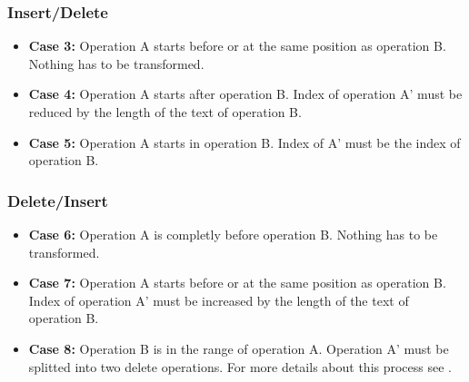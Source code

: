 \subsubsection{Insert/Delete}
\begin{itemize}
\item \textbf{Case 3:}
Operation A starts before or at the same position as operation B. Nothing has to be transformed.
\item \textbf{Case 4:}
Operation A starts after operation B. Index of operation A' must be reduced by the length of the text of operation B.
\item \textbf{Case 5:}
Operation A starts in operation B. Index of A' must be the index of operation B.
\end{itemize}

\subsubsection{Delete/Insert}
\begin{itemize}
\item \textbf{Case 6:}
Operation A is completly before operation B. Nothing has to be transformed.
\item \textbf{Case 7:}
Operation A starts before or at the same position as operation B. Index of operation A' must be increased by the length of the text of operation B.
\item \textbf{Case 8:}
Operation B is in the range of operation A. Operation A' must be splitted into two delete operations. For more details about this process see \cite{Split_Operation}.
\end{itemize}

